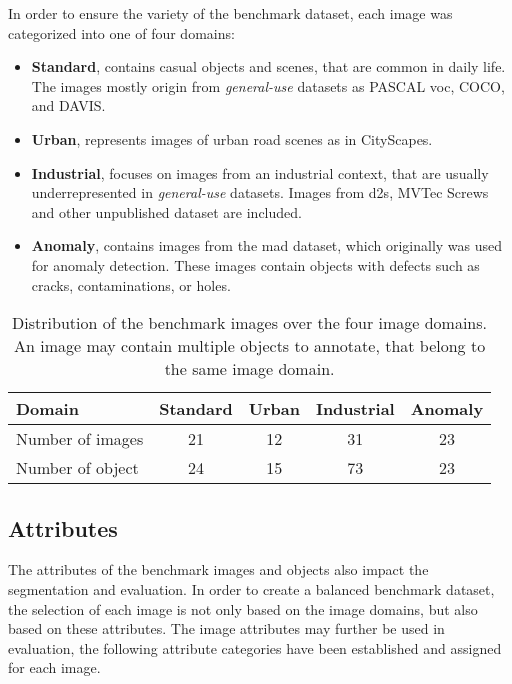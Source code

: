 In order to ensure the variety of the benchmark dataset, each image was categorized into one of four domains:
%
\begin{itemize}
	\item \textbf{Standard}, contains casual objects and scenes, that are common in daily life.
	The images mostly origin from \textit{general-use} datasets as PASCAL \gls{voc}, COCO, and DAVIS.
	\item \textbf{Urban}, represents images of urban road scenes as in CityScapes.
	\item \textbf{Industrial}, focuses on images from an industrial context, that are usually underrepresented in  \textit{general-use} datasets.
	Images from \gls{d2s}, MVTec Screws and other unpublished dataset are included.
	\item \textbf{Anomaly}, contains images from the \gls{mad} dataset, which originally was used for anomaly detection.
	These images contain objects with defects such as cracks, contaminations, or holes.
\end{itemize}

\begin{table}[h!]
	\centering
	\begin{tabular}{l|c|c|c|c}
		Domain				& Standard & Urban & Industrial & Anomaly \\
		\hline
		Number of images 	& 21 & 12 & 31 & 23 \\
		Number of object 	& 24 & 15 & 73 & 23 \\
	\end{tabular}
	\caption[Overview of image domains]{
		Distribution of the benchmark images over the four image domains.
		An image may contain multiple objects to annotate, that belong to the same image domain.
		} \label{tab:ch4:domains_overview}
\end{table}

\subsection{Attributes}\label{ord:ch4:sec2:subsec2}

The attributes of the benchmark images and objects also impact the segmentation and evaluation.
In order to create a balanced benchmark dataset, the selection of each image is not only based on the image domains, but also based on these attributes.
The image attributes may further be used in evaluation, the following attribute categories have been established and assigned for each image.

